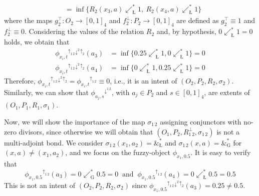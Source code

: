 \documentclass[runningheads,a4paper]{llncs}
\newcommand{\up}[1][]{{^{\uparrow_{#1}}}}
\newcommand{\down}[1][]{{^{\downarrow^{#1}}}}
\newcommand{\adjoint}{\mathop{\&}\nolimits}
\newcommand{\G}{\text{G}}
\let\oldLcommand\L
\let\L\relax
\def\L{\text{\oldLcommand}}
\newcommand{\cred}[1]{{\color{red} #1}}
\begin{document}
\begin{example}
\begin{align*}
    &= \inf \{R_2(x_3, a) \swarrow^*_\L 1, \ R_2(x_4, a) \swarrow^*_\L 1\}
\end{align*}
where the maps $g_2^\top \colon O_2 \to [0, 1]_4$ and $f_2^\bot \colon P_2 \to [0, 1]_4$ are defined as $g_2^\top \equiv 1$ and $f_2^\bot \equiv 0$. 
Considering the values of the relation $R_2$ and, by hypothesis, $0 \swarrow^*_\L 1 = 0$ holds, we obtain that
\begin{align*}
    \phi_{x_i, t}\up[1\,2]\down[2]\up[2](a_3) &= \inf \{0.25 \swarrow^*_\L 1, 0 \swarrow^*_\L 1 \} = 0 \\
    \phi_{x_i, t}\up[1\,2]\down[2]\up[2](a_4) &= \inf \{0 \swarrow^*_\L 1, 0.25 \swarrow^*_\L 1 \} = 0
\end{align*}
Therefore, $\phi_{x_i, t}\up[1\,2]\down[2]\up[2] = \phi_{x_i, t}\up[1\,2] \equiv 0$, i.e., 
 it is an intent of $(O_2, P_2, R_2, \sigma_2)$. Similarly, we can show that $\phi_{a_j, s}\down[1\,2]$, with $a_j\in P_2$ and $s\in [0, 1]_4$, are extents of $(O_1, P_1, R_1, \sigma_1)$. 

Now, we will show the importance of the map $\sigma_{1\,2}$ assigning conjunctors with no-zero divisors, since otherwise we will obtain that $(O_1, P_2, R_{1\,2}^\bot, \sigma_{1\,2})$ is not a multi-adjoint bond. We consider $\sigma_{1\,2}(x_1, a_2) = \adjoint^*_\L$ and $\sigma_{1\,2}(x, a) = \adjoint^*_\G$ for $(x, a) \neq (x_1, a_2)$, and we focus on
the fuzzy-object $\phi_{x_1, 0.5}$. It is easy to verify that 
$$
    \phi_{x_1, 0.5}\up[1\,2](a_3) = 0 \swarrow^*_\G 0.5 = 0 ~\text{ and }~ \phi_{x_1, 0.5}\up[1\,2](a_4) = 0 \swarrow^*_\L 0.5 = 0.5
$$
This is not an intent of $(O_2, P_2, R_2, \sigma_2)$ since 
$
\phi_{x_1, 0.5}\up[1\,2]\down[2]\up[2](a_3) = 0.25 \neq 0.5
$.


\end{example}
\end{document}
